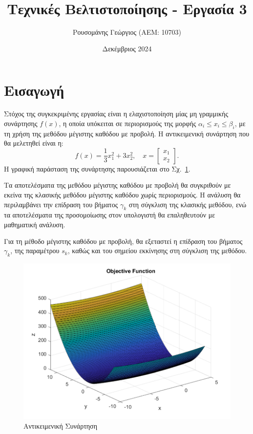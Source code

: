 \documentclass[a4paper,12pt]{article}
\title{Τεχνικές Βελτιστοποίησης - Εργασία 3}
\author{Ρουσομάνης Γεώργιος (ΑΕΜ: 10703)}
\date{Δεκέμβριος 2024}
\begin{document}
\maketitle

\section*{Εισαγωγή}

Στόχος της συγκεκριμένης εργασίας είναι η ελαχιστοποίηση μίας μη γραμμικής συνάρτησης $f(x)$, η οποία υπόκειται σε
περιορισμούς της μορφής $\alpha_i \leq x_i \leq \beta_i$, με τη χρήση της μεθόδου μέγιστης καθόδου με προβολή. 
Η αντικειμενική συνάρτηση που θα μελετηθεί είναι η:
\[
f(x) = \frac{1}{3} x_1^2 + 3 x_2^2, \quad x = \begin{bmatrix} x_1 \\ x_2 \end{bmatrix}.
\]
Η γραφική παράσταση της συνάρτησης παρουσιάζεται στο Σχ.~\ref{fig:objective_function}. 

Τα αποτελέσματα της μεθόδου μέγιστης καθόδου με προβολή θα συγκριθούν με εκείνα της κλασικής μεθόδου μέγιστης καθόδου
χωρίς περιορισμούς. Η ανάλυση θα περιλαμβάνει την επίδραση του βήματος $\gamma_k$ στη σύγκλιση της κλασικής μεθόδου, 
ενώ τα αποτελέσματα της προσομοίωσης στον υπολογιστή θα επαληθευτούν με μαθηματική ανάλυση.

Για τη μέθοδο μέγιστης καθόδου με προβολή, θα εξεταστεί η επίδραση του βήματος $\gamma_k$, της παραμέτρου $s_k$, 
καθώς και του σημείου εκκίνησης στη σύγκλιση της μεθόδου. 

\begin{figure}
    \centering
    \includegraphics[width=1\linewidth]{plot/objective_function.pdf}
    \caption{Αντικειμενική Συνάρτηση}
    \label{fig:objective_function}
\end{figure}
\end{document}
